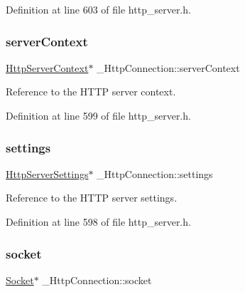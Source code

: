 Definition at line 603 of file http\+\_\+server.\+h.

\mbox{\label{struct__HttpConnection_ae6609bf946aef4d1cf4294da4ed6d30f}} 
\subsubsection{\texorpdfstring{server\+Context}{serverContext}}
{\footnotesize\ttfamily \hyperlink{http__server_8h_a952abbfa31a2188c3d65357e79531e03}{Http\+Server\+Context}$\ast$ \+\_\+\+Http\+Connection\+::server\+Context}



Reference to the H\+T\+TP server context. 



Definition at line 599 of file http\+\_\+server.\+h.

\mbox{\label{struct__HttpConnection_a1b59b2b74c9d694c6d8f1353f0252aa4}} 
\subsubsection{\texorpdfstring{settings}{settings}}
{\footnotesize\ttfamily \hyperlink{structHttpServerSettings}{Http\+Server\+Settings}$\ast$ \+\_\+\+Http\+Connection\+::settings}



Reference to the H\+T\+TP server settings. 



Definition at line 598 of file http\+\_\+server.\+h.

\mbox{\label{struct__HttpConnection_a3a586001947439df268bc5a3fb6dc817}} 
\subsubsection{\texorpdfstring{socket}{socket}}
{\footnotesize\ttfamily \hyperlink{socket_8h_aa85acfb0fa336ef495e6ba87fb88fc48}{Socket}$\ast$ \+\_\+\+Http\+Connection\+::socket}



